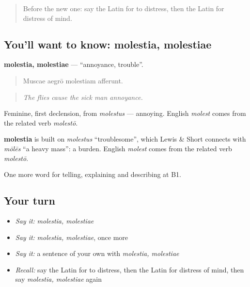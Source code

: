 \begin{quote}
Before the new one: say the Latin for to distress, then the Latin for distress of mind.
\end{quote}

\subsection*{You'll want to know: molestia, molestiae}
\textbf{molestia, molestiae} — \textquotedblleft{}annoyance, trouble\textquotedblright{}.

\begin{quote}
Muscae aegrō molestiam afferunt.
\end{quote}

\begin{quote}
\emph{The flies cause the sick man annoyance.}
\end{quote}

Feminine, first declension, from \emph{molestus} — annoying. English \emph{molest} comes from the related verb \emph{molestō}.

\begin{cousinweb}
\textbf{molestia} is built on \emph{molestus} \textquotedblleft{}troublesome\textquotedblright{}, which Lewis \& Short connects with \emph{mōlēs} \textquotedblleft{}a heavy mass\textquotedblright{}: a burden. English \emph{molest} comes from the related verb \emph{molestō}.
\end{cousinweb}

\begin{grammarlens}[title={What you've built}]
One more word for telling, explaining and describing at B1.
\end{grammarlens}

\subsection*{Your turn}
\begin{itemize}
\raggedright
  \item \emph{Say it:} \emph{molestia, molestiae}
  \item \emph{Say it:} \emph{molestia, molestiae}, once more
  \item \emph{Say it:} a sentence of your own with \emph{molestia, molestiae}
  \item \emph{Recall:} say the Latin for to distress, then the Latin for distress of mind, then say \emph{molestia, molestiae} again
\end{itemize}


